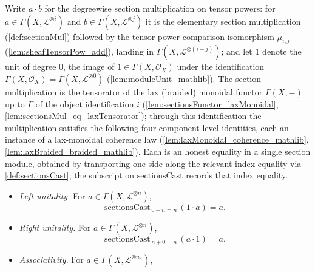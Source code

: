 \begin{lemma}
  \label{lem:sectionMul_coherent}
  Write \(a \cdot b\) for the degreewise section multiplication on tensor powers:
  for \(a \in \Gamma(X, \mathcal{L}^{\otimes i})\) and
  \(b \in \Gamma(X, \mathcal{L}^{\otimes j})\) it is the elementary section
  multiplication (\cref{def:sectionMul}) followed by the tensor-power comparison
  isomorphism \(\mu_{i,j}\) (\cref{lem:sheafTensorPow_add}), landing in
  \(\Gamma(X, \mathcal{L}^{\otimes (i+j)})\); and let \(1\) denote the unit of
  degree \(0\), the image of \(1 \in \Gamma(X,\mathcal{O}_X)\) under the
  identification \(\Gamma(X,\mathcal{O}_X) = \Gamma(X, \mathcal{L}^{\otimes 0})\)
  (\cref{lem:moduleUnit_mathlib}). The section multiplication is the tensorator of
  the lax (braided) monoidal functor \(\Gamma(X,-)\) up to \(\Gamma\) of the object
  identification \(i\) (\cref{lem:sectionsFunctor_laxMonoidal},
  \cref{lem:sectionsMul_eq_laxTensorator}); through this identification the
  multiplication satisfies the following four component-level identities, each an
  instance of a lax-monoidal coherence law
  (\cref{lem:laxMonoidal_coherence_mathlib},
  \cref{lem:laxBraided_braided_mathlib}). Each is
  an honest equality in a single section module, obtained by transporting one side
  along the relevant index equality via \cref{def:sectionsCast}; the subscript on
  \(\mathrm{sectionsCast}\) records that index equality.
  \begin{itemize}
    \item \emph{Left unitality.} For \(a \in \Gamma(X, \mathcal{L}^{\otimes n})\),
      \[
        \mathrm{sectionsCast}_{\,0+n=n}\,(1 \cdot a) = a .
      \]
    \item \emph{Right unitality.} For \(a \in \Gamma(X, \mathcal{L}^{\otimes n})\),
      \[
        \mathrm{sectionsCast}_{\,n+0=n}\,(a \cdot 1) = a .
      \]
    \item \emph{Associativity.} For
      \(a \in \Gamma(X, \mathcal{L}^{\otimes n_a})\),

\end{itemize}
\end{lemma}
